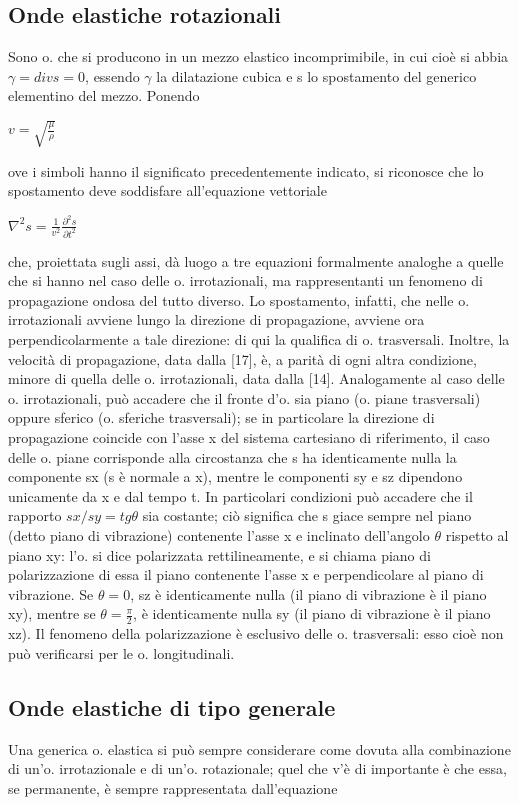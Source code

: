 \documentclass[a4paper]{article}
\begin{document}
\subsection{Onde elastiche rotazionali}
Sono o. che si producono in un mezzo elastico incomprimibile, in cui cioè si abbia $\gamma=div s=0$, essendo $\gamma$ la dilatazione cubica e s lo spostamento del generico elementino del mezzo. Ponendo 

$v=\sqrt{\frac{\mu}{\rho}}$

ove i simboli hanno il significato precedentemente indicato, si riconosce che lo spostamento deve soddisfare all’equazione vettoriale 

$\nabla^2 s =\frac{1}{v^2}\frac{\partial^2 s}{\partial t^2}$

che, proiettata sugli assi, dà luogo a tre equazioni formalmente analoghe a quelle che si hanno nel caso delle o. irrotazionali, ma rappresentanti un fenomeno di propagazione ondosa del tutto diverso. Lo spostamento, infatti, che nelle o. irrotazionali avviene lungo la direzione di propagazione, avviene ora perpendicolarmente a tale direzione: di qui la qualifica di o. trasversali. Inoltre, la velocità di propagazione, data dalla [17], è, a parità di ogni altra condizione, minore di quella delle o. irrotazionali, data dalla [14]. Analogamente al caso delle o. irrotazionali, può accadere che il fronte d’o. sia piano (o. piane trasversali) oppure sferico (o. sferiche trasversali); se in particolare la direzione di propagazione coincide con l’asse x del sistema cartesiano di riferimento, il caso delle o. piane corrisponde alla circostanza che s ha identicamente nulla la componente sx (s è normale a x), mentre le componenti sy e sz dipendono unicamente da x e dal tempo t. In particolari condizioni può accadere che il rapporto $sx/sy=tg \theta$ sia costante; ciò significa che s giace sempre nel piano (detto piano di vibrazione) contenente l’asse x e inclinato dell’angolo $\theta$ rispetto al piano xy: l’o. si dice polarizzata rettilineamente, e si chiama piano di polarizzazione di essa il piano contenente l’asse x e perpendicolare al piano di vibrazione. Se $\theta=0$, sz è identicamente nulla (il piano di vibrazione è il piano xy), mentre se $\theta=\frac{\pi}{2}$, è identicamente nulla sy (il piano di vibrazione è il piano xz). Il fenomeno della polarizzazione è esclusivo delle o. trasversali: esso cioè non può verificarsi per le o. longitudinali. 

\subsection{Onde elastiche di tipo generale}
Una generica o. elastica si può sempre considerare come dovuta alla combinazione di un’o. irrotazionale e di un’o. rotazionale; quel che v’è di importante è che essa, se permanente, è sempre rappresentata dall’equazione 
\end{document}
